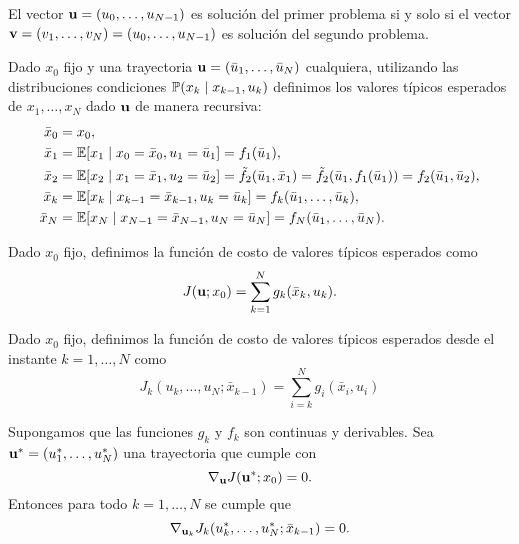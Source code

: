 \begin{proposition}
	El vector \(\mathbf{u} = (u_{0}, \dotsc, u_{N-1})\) es solución del primer problema si y solo si el vector \(\mathbf{v} = (v_{1}, \dotsc, v_{N}) = (u_{0}, \dotsc, u_{N-1})\) es solución del segundo problema.
\end{proposition}

\begin{definition}
	Dado \(x_{0}\) fijo y una trayectoria \(\mathbf{u} = (\bar{u}_{1}, \dotsc, \bar{u}_{N})\) cualquiera, utilizando las distribuciones condiciones \(\mathbb{P}(x_{k} \mid x_{k-1}, u_{k})\) definimos los valores típicos esperados de \(x_{1}, \dotsc, x_{N}\) dado \(\mathbf{u}\) de manera recursiva:
	\begin{align*}
		\bar{x}_{0}	&= x_{0}, \\
		\bar{x}_{1}	&= \mathbb{E}[x_{1} \mid x_{0} = \bar{x}_{0}, u_{1} = \bar{u}_{1}] = f_{1}(\bar{u}_{1}), \\
		\bar{x}_{2}	&= \mathbb{E}[x_{2} \mid x_{1} = \bar{x}_{1}, u_{2} = \bar{u}_{2}] = \tilde{f}_{2}(\bar{u}_{1}, \bar{x}_{1}) = \tilde{f}_{2}(\bar{u}_{1}, f_{1}(\bar{u}_{1})) = f_{2}(\bar{u}_{1}, \bar{u}_{2}), \\
		\bar{x}_{k}	&= \mathbb{E}[x_{k} \mid x_{k-1} = \bar{x}_{k-1}, u_{k} = \bar{u}_{k}] = f_{k}(\bar{u}_{1}, \dotsc, \bar{u}_{k}), \\
		\bar{x}_{N}	&= \mathbb{E}[x_{N} \mid x_{N-1} = \bar{x}_{N-1}, u_{N} = \bar{u}_{N}] = f_{N}(\bar{u}_{1}, \dotsc, \bar{u}_{N}).
	\end{align*}
\end{definition}

\begin{definition}
	Dado \(x_{0}\) fijo, definimos la función de costo de valores típicos esperados como
	\begin{equation*}
		J(\mathbf{u}; x_{0}) = \sum_{k=1}^{N} g_{k}(\bar{x}_{k}, u_{k}).
	\end{equation*}
\end{definition}

\begin{definition}
	Dado \(x_{0}\) fijo, definimos la función de costo de valores típicos esperados desde el instante \(k = 1, \dotsc, N\) como
	\begin{equation*}
		J_{k}(u_{k}, \dotsc, u_{N}; \bar{x}_{k-1}) = \sum_{i=k}^{N} g_{i}(\bar{x}_{i}, u_{i})
	\end{equation*}
\end{definition}


\begin{proposition}
	Supongamos que las funciones \(g_{k}\) y \(f_{k}\) son continuas y derivables. Sea \(\mathbf{u}^{\ast} = (u_{1}^{\ast}, \dotsc, u_{N}^{\ast})\) una trayectoria que cumple con
	\begin{equation*}
		\nabla_{\mathbf{u}} J(\mathbf{u}^{\ast}; x_{0}) = 0.
	\end{equation*}
	Entonces para todo \(k = 1, \dotsc, N\) se cumple que
	\begin{equation*}
		\nabla_{\mathbf{u}_{k}} J_{k}(u_{k}^{\ast}, \dotsc, u_{N}^{\ast}; \bar{x}_{k-1}) = 0.
	\end{equation*}
\end{proposition}


